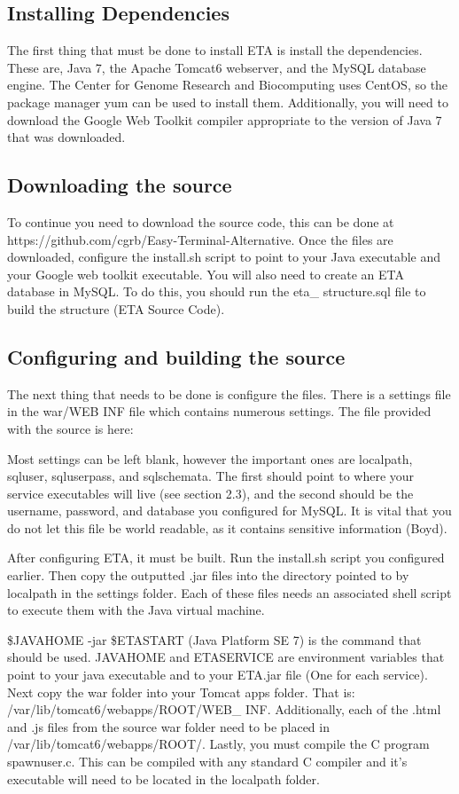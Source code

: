 \documentclass[a4paper,12pt]{article}
\begin{document}
\subsection{Installing Dependencies}
 The first thing that must be done to install ETA is install the dependencies. These are, Java 7, the Apache Tomcat6 webserver, and the MySQL database engine. The Center for Genome Research and Biocomputing uses CentOS, so the package manager yum can be used to install them. Additionally, you will need to download the Google Web Toolkit compiler appropriate to the version of Java 7 that was downloaded.
\subsection{Downloading the source}
 To continue you need to download the source code, this can be done at https://github.com/cgrb/Easy-Terminal-Alternative. Once the files are downloaded, configure the install.sh script to point to your Java executable and your Google web toolkit executable. You will also need to create an ETA database in MySQL. To do this, you should run the eta\_ structure.sql file to build the structure (ETA Source Code).

\subsection{Conﬁguring and building the source}

 The next thing that needs to be done is configure the files. There is a settings file in the war/WEB\- INF file which contains numerous settings. The file provided with the source is here:
 
 

 Most settings can be left blank, however the important ones are localpath, sqluser, sqluserpass, and sqlschemata. The first should point to where your service executables will live (see section 2.3), and the second should be the username, password, and database you configured for MySQL. It is vital that you do not let this file be world readable, as it contains sensitive information (Boyd).
 
 After configuring ETA, it must be built. Run the install.sh script you configured earlier. Then copy the outputted .jar files into the directory pointed to by localpath in the settings folder. Each of these files needs an associated shell script to execute them with the Java virtual machine.
 
\$JAVAHOME -jar
 \$ETASTART (Java Platform SE 7) is the command that should be used. JAVAHOME and ETASERVICE are environment variables that point to your java executable and to your ETA.jar file (One for each service). Next copy the war folder into your Tomcat apps folder. That is: /var/lib/tomcat6/webapps/ROOT/WEB\_ INF. Additionally, each of the .html and .js files from the source war folder need to be placed in /var/lib/tomcat6/webapps/ROOT/. Lastly, you must compile the C program spawnuser.c. This can be compiled with any standard C compiler and it's executable will need to be located in the localpath folder.
 
\end{document}
